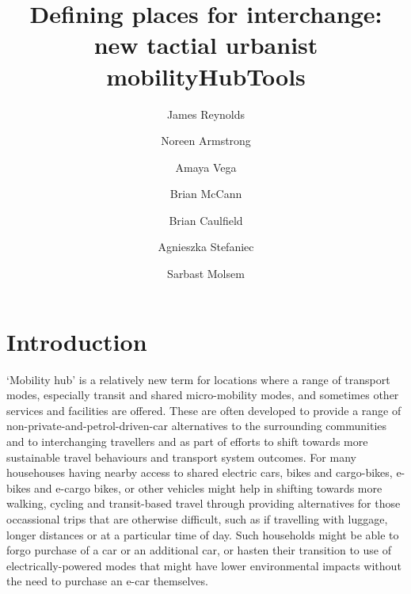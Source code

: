 \documentclass[preprint, 3p,
authoryear]{elsarticle} %
\begin{document}
\begin{frontmatter}

  \title{Defining places for interchange: new tactial urbanist
mobilityHubTools}
    \author[]{James Reynolds%
  }
    \author[]{Noreen Armstrong%
  }
    \author[]{Amaya Vega%
  }
    \author[]{Brian McCann%
  }
    \author[]{Brian Caulfield%
  }
    \author[]{Agnieszka Stefaniec%
  }
    \author[]{Sarbast Molsem%
  }
  
  \begin{abstract}
  
  \end{abstract}
  
 \end{frontmatter}

\section{Introduction}\label{introduction}

`Mobility hub' is a relatively new term for locations where a range of
transport modes, especially transit and shared micro-mobility modes, and
sometimes other services and facilities are offered. These are often
developed to provide a range of non-private-and-petrol-driven-car
alternatives to the surrounding communities and to interchanging
travellers and as part of efforts to shift towards more sustainable
travel behaviours and transport system outcomes. For many househouses
having nearby access to shared electric cars, bikes and cargo-bikes,
e-bikes and e-cargo bikes, or other vehicles might help in shifting
towards more walking, cycling and transit-based travel through providing
alternatives for those occassional trips that are otherwise difficult,
such as if travelling with luggage, longer distances or at a particular
time of day. Such households might be able to forgo purchase of a car or
an additional car, or hasten their transition to use of
electrically-powered modes that might have lower environmental impacts
without the need to purchase an e-car themselves.
\end{document}
